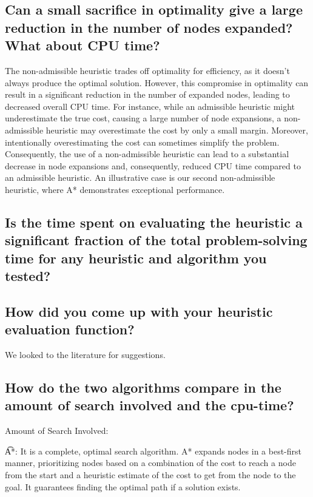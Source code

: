 \documentclass{article}
\begin{document}
\subsection{  Can a small sacrifice in optimality give a large reduction in the number of nodes expanded? What about CPU time?}

{The non-admissible heuristic trades off optimality for efficiency, as it doesn't always produce the optimal solution. However, this compromise in optimality can result in a significant reduction in the number of expanded nodes, leading to decreased overall CPU time. For instance, while an admissible heuristic might underestimate the true cost, causing a large number of node expansions, a non-admissible heuristic may overestimate the cost by only a small margin. Moreover, intentionally overestimating the cost can sometimes simplify the problem. Consequently, the use of a non-admissible heuristic can lead to a substantial decrease in node expansions and, consequently, reduced CPU time compared to an admissible heuristic. An illustrative case is our second non-admissible heuristic, where A* demonstrates exceptional performance.}

\subsection{ Is the time spent on evaluating the heuristic a significant fraction of the total problem-solving time for any heuristic and algorithm you tested?}

\subsection{ How did you come up with your heuristic evaluation function?}

{We looked to the literature for suggestions. }

\subsection{ How do the two algorithms compare in the amount of search involved and the cpu-time?}

{Amount of Search Involved:}

\t A*: It is a complete, optimal search algorithm. A* expands nodes in a best-first manner, prioritizing nodes based on a combination of the cost to reach a node from the start and a heuristic estimate of the cost to get from the node to the goal. It guarantees finding the optimal path if a solution exists.
\end{document}
